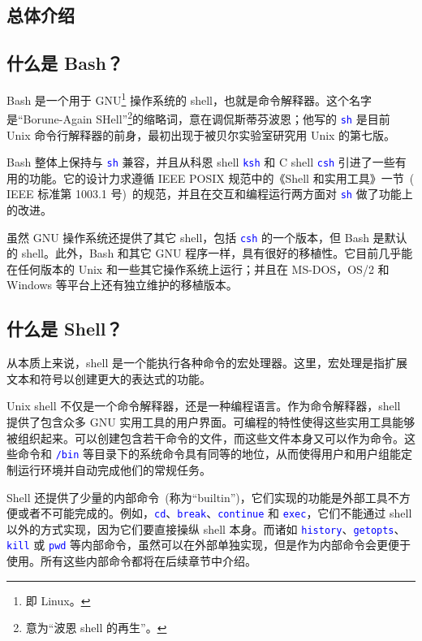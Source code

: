 \documentclass[openany,notitlepage]{book}
\newcommand{\code}[1]{\textcolor{blue}{{\tt #1}}}
\begin{document}
\begin{CJK}{UTF8}{song}
\mainmatter
{}
\setcounter{page}{1}
\pagestyle{myfancy} %


\renewcommand{\chaptermark}[1]{\markboth{第\CJKnumber{\thechapter}章 \MakeUppercase{#1}}{}}
\renewcommand{\sectionmark}[1]{\markright{\S\,\thesection\ \MakeUppercase{#1}}}

\chapter{总体介绍} %
\section{什么是 Bash？} %
Bash 是一个用于 GNU\footnote{即 Linux。} 操作系统的 shell，也就是命令解释器。这个名字是``Borune-Again SHell''\footnote{意为``波恩 shell 的再生''。}的缩略词，意在调侃斯蒂芬\textbullet 波恩；他写的 \code{sh} 是目前 Unix 命令行解释器的前身，最初出现于被贝尔实验室研究用 Unix 的第七版。

Bash 整体上保持与 \code{sh} 兼容，并且从科恩 shell \code{ksh} 和 C shell \code{csh} 引进了一些有用的功能。它的设计力求遵循  IEEE POSIX 规范中的《Shell 和实用工具》一节~( IEEE 标准第 1003.1 号)~的规范，并且在交互和编程运行两方面对 \code{sh} 做了功能上的改进。

虽然 GNU 操作系统还提供了其它 shell，包括 \code{csh} 的一个版本，但 Bash 是默认的 shell。此外，Bash 和其它 GNU 程序一样，具有很好的移植性。它目前几乎能在任何版本的 Unix 和一些其它操作系统上运行；并且在 MS-DOS，OS/2 和 Windows 等平台上还有独立维护的移植版本。

\section{什么是 Shell？} %
从本质上来说，shell 是一个能执行各种命令的宏处理器。这里，宏处理是指扩展文本和符号以创建更大的表达式的功能。

Unix shell 不仅是一个命令解释器，还是一种编程语言。作为命令解释器，shell 提供了包含众多 GNU 实用工具的用户界面。可编程的特性使得这些实用工具能够被组织起来。可以创建包含若干命令的文件，而这些文件本身又可以作为命令。这些命令和 \code{/bin} 等目录下的系统命令具有同等的地位，从而使得用户和用户组能定制运行环境并自动完成他们的常规任务。

Shell 还提供了少量的内部命令~(称为``builtin'')，它们实现的功能是外部工具不方便或者不可能完成的。例如，\code{cd}、\code{break}、\code{continue} 和 \code{exec}，它们不能通过 shell 以外的方式实现，因为它们要直接操纵 shell 本身。而诸如 \code{history}、\code{getopts}、\code{kill} 或 \code{pwd} 等内部命令，虽然可以在外部单独实现，但是作为内部命令会更便于使用。所有这些内部命令都将在后续章节中介绍。


\end{CJK}
\end{document}
